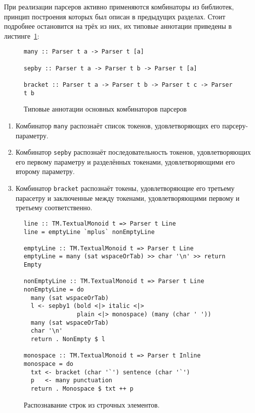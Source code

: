 При реализации парсеров активно применяются комбинаторы из библиотек, принцип
построения которых был описан в предыдущих разделах. Стоит подробнее остановится
на трёх из них, их типовые аннотации приведены в 
листинге~\ref{listing:ParserCombinators}:

\begin{figure}[h]
\begin{lstlisting}
many :: Parser t a -> Parser t [a]

sepby :: Parser t a -> Parser t b -> Parser t [a]

bracket :: Parser t a -> Parser t b -> Parser t c -> Parser t b
\end{lstlisting}
\caption{Типовые аннотации основных комбинаторов парсеров}
\label{listing:ParserCombinators}
\end{figure}

\begin{enumerate}
  \item Комбинатор \lstinline{many} распознаёт список токенов, удовлетворяющих
  его парсеру-параметру.
  \item Комбинатор \lstinline{sepby} распознаёт последовательность токенов,
  удовлетворяющих его первому параметру и разделённых токенами, удовлетворяющими 
  его второму параметру.
  \item Комбинатор \lstinline{bracket} распознаёт токены, удовлетворяющие его
  третьему парасетру и заключенные между токенами, удовлетворяющими первому и
  третьему соответственно.
\end{enumerate}

\begin{figure}[t]
\begin{lstlisting}
line :: TM.TextualMonoid t => Parser t Line
line = emptyLine `mplus` nonEmptyLine

emptyLine :: TM.TextualMonoid t => Parser t Line
emptyLine = many (sat wspaceOrTab) >> char '\n' >> return Empty

nonEmptyLine :: TM.TextualMonoid t => Parser t Line
nonEmptyLine = do
  many (sat wspaceOrTab)
  l <- sepby1 (bold <|> italic <|> 
               plain <|> monospace) (many (char ' '))
  many (sat wspaceOrTab)
  char '\n'
  return . NonEmpty $ l

monospace :: TM.TextualMonoid t => Parser t Inline
monospace = do
  txt <- bracket (char '`') sentence (char '`')
  p   <- many punctuation
  return . Monospace $ txt ++ p
\end{lstlisting}
\caption{Распознавание строк из строчных элементов.}
\label{listing:MarkdownInline}
\end{figure}

